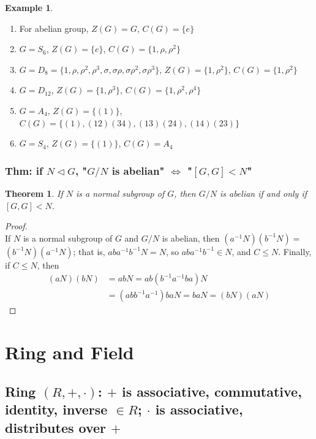 \documentclass[11pt,a4paper]{article}
\newtheorem{theorem}{Theorem}
\newtheorem{example}{Example}
\begin{document}
\begin{example}
\end{example}
\begin{enumerate}[(1)]
    \item For abelian group, $Z(G)=G$, $C(G)=\{e\}$
    \item $G=S_6$, $Z(G)=\{e\}$, $C(G)=\{1,\rho,\rho^2\}$
    \item $G=D_8=\{1,\rho,\rho^2,\rho^3,\sigma,\sigma\rho,\sigma\rho^2,\sigma\rho^3\}$, $Z(G)=\{1,\rho^2\}$, $C(G)=\{1,\rho^2\}$
    \item $G=D_12$, $Z(G)=\{1,\rho^3\}$, $C(G)=\{1,\rho^2,\rho^4\}$
    \item $G=A_4$, $Z(G)=\{(1)\}$, $C(G)=\{(1),(12)(34),(13)(24),(14)(23)\}$
    \item $G=S_4$, $Z(G)=\{(1)\}$, $C(G)=A_4$
\end{enumerate}

\subsubsection{Thm: if $N \lhd G$, "$G/N$ is abelian" $\Leftrightarrow$ "$[G,G] < N$"}
\begin{theorem}
    If $N$ is a normal subgroup of $G$, then $G/N$ is abelian if and only if $[G,G] < N$.
\end{theorem}
\begin{proof}
\quad\\
If $N$ is a normal subgroup of $G$ and $G / N$ is abelian, then $\left(a^{-1} N\right)\left(b^{-1} N\right)=$ $\left(b^{-1} N\right)\left(a^{-1} N\right)$; that is, $a b a^{-1} b^{-1} N=N$, so $a b a^{-1} b^{-1} \in N$, and $C \leq N$. Finally, if $C \leq N$, then
$$
\begin{aligned}
(a N)(b N) &=a b N=a b\left(b^{-1} a^{-1} b a\right) N \\
&=\left(a b b^{-1} a^{-1}\right) b a N=b a N=(b N)(a N)
\end{aligned}
$$
\end{proof}


\section{Ring and Field}
\subsection{Ring $(R,+,\cdot)$: $+$ is associative, commutative, identity, inverse $\in R$; $\cdot$ is associative, distributes over $+$}
\end{document}
